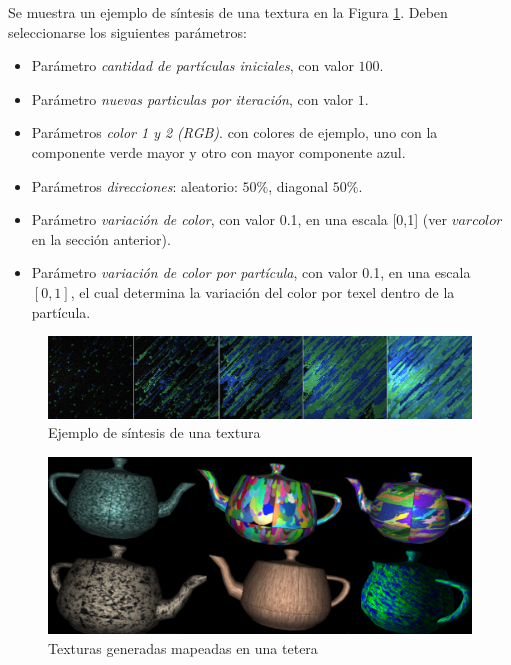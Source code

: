 \documentclass[spanish,a4paper,openright,11pt]{book}
\begin{document}
Se muestra un ejemplo de s\'intesis de una textura en la Figura \ref{sintesis}. Deben seleccionarse los siguientes par\'ametros:

\begin{itemize}
\item Par\'ametro {\em cantidad de part\'iculas iniciales}, con valor $100$.
\item Par\'ametro {\em nuevas particulas por iteraci\'on}, con valor $1$.
\item Par\'ametros {\em color 1 y 2 (RGB)}. con colores de ejemplo, uno con la componente verde mayor y otro con mayor componente azul.
\item Par\'ametros {\em direcciones}: aleatorio: $50\%$, diagonal $50\%$.
\item Par\'ametro {\em variaci\'on de color}, con valor 0.1, en una escala [0,1] (ver $varcolor$ en la secci\'on anterior).
\item Par\'ametro {\em variaci\'on de color por part\'icula}, con valor 0.1, en una escala $[0,1]$, el cual determina la variaci\'on del color por texel dentro de la part\'icula.
\end{itemize}

\begin{figure}[t!]
\centering
\includegraphics[scale=0.12]{sintesis}
\caption{Ejemplo de s\'intesis de una textura}
\label{sintesis}
\end{figure}

\begin{figure}[t!]
\centering
\includegraphics[scale=0.14]{teteras}
\caption{Texturas generadas mapeadas en una tetera}
\label{teteras}
\end{figure}
\end{document}
